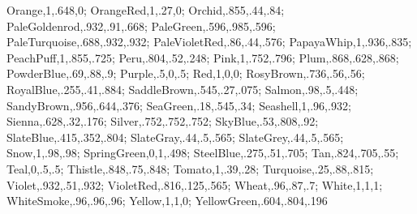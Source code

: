 {Orange,1,.648,0;%
OrangeRed,1,.27,0;%
Orchid,.855,.44,.84;%
PaleGoldenrod,.932,.91,.668;%
PaleGreen,.596,.985,.596;%
PaleTurquoise,.688,.932,.932;%
PaleVioletRed,.86,.44,.576;%
PapayaWhip,1,.936,.835;%
PeachPuff,1,.855,.725;%
Peru,.804,.52,.248;%
Pink,1,.752,.796;%
Plum,.868,.628,.868;%
PowderBlue,.69,.88,.9;%
Purple,.5,0,.5;%
Red,1,0,0;%
RosyBrown,.736,.56,.56;%
RoyalBlue,.255,.41,.884;%
SaddleBrown,.545,.27,.075;%
Salmon,.98,.5,.448;%
SandyBrown,.956,.644,.376;%
SeaGreen,.18,.545,.34;%
Seashell,1,.96,.932;%
Sienna,.628,.32,.176;%
Silver,.752,.752,.752;%
SkyBlue,.53,.808,.92;%
SlateBlue,.415,.352,.804;%
SlateGray,.44,.5,.565;%
SlateGrey,.44,.5,.565;%
Snow,1,.98,.98;%
SpringGreen,0,1,.498;%
SteelBlue,.275,.51,.705;%
Tan,.824,.705,.55;%
Teal,0,.5,.5;%
Thistle,.848,.75,.848;%
Tomato,1,.39,.28;%
Turquoise,.25,.88,.815;%
Violet,.932,.51,.932;%
VioletRed,.816,.125,.565;%
Wheat,.96,.87,.7;%
White,1,1,1;%
WhiteSmoke,.96,.96,.96;%
Yellow,1,1,0;%
YellowGreen,.604,.804,.196}
